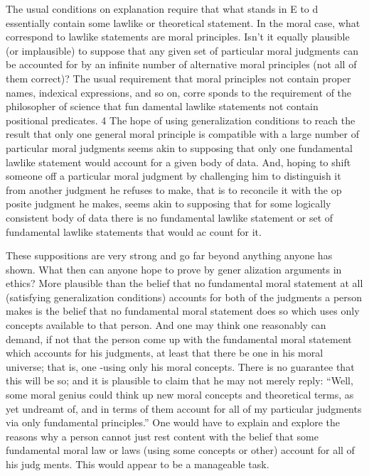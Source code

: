 \documentclass[11pt,openany]{book}
\begin{document}
The usual conditions on explanation require that what stands in E to d essentially contain some lawlike or theoretical statement. In the moral case, what correspond to lawlike statements are moral principles. Isn't it equally plausible (or implausible) to suppose that any given set of particular moral judgments can be accounted for by an infinite number of alternative moral principles (not all of them correct)? The usual requirement that moral principles not contain proper names, indexical expressions, and so on, corre sponds to the requirement of the philosopher of science that fun damental lawlike statements not contain positional predicates. 4 The hope of using generalization conditions to reach the result that only one general moral principle is compatible with a large number of particular moral judgments seems akin to supposing that only one fundamental lawlike statement would account for a given body of data. And, hoping to shift someone off a particular moral judgment by challenging him to distinguish it from another judgment he refuses to make, that is to reconcile it with the op posite judgment he makes, seems akin to supposing that for some logically consistent body of data there is no fundamental lawlike statement or set of fundamental lawlike statements that would ac count for it. 

These suppositions are very strong and go far beyond anything anyone has shown. What then can anyone hope to prove by gener alization arguments in ethics? More plausible than the belief that no fundamental moral statement at all (satisfying generalization conditions) accounts for both of the judgments a person makes is the belief that no fundamental moral statement does so which uses only concepts available to that person. And one may think one reasonably can demand, if not that the person come up with the fundamental moral statement which accounts for his judgments, at least that there be one in his moral universe; that is, one -using only his moral concepts. There is no guarantee that this will be so; and it is plausible to claim that he may not merely reply: ``Well, some moral genius could think up new moral concepts and theoretical terms, as yet undreamt of, and in terms of them account for all of my particular judgments via only fundamental principles.'' One would have to explain and explore the reasons why a person cannot just rest content with the belief that some fundamental moral law or laws (using some concepts or other) account for all of his judg ments. This would appear to be a manageable task. 
\end{document}
